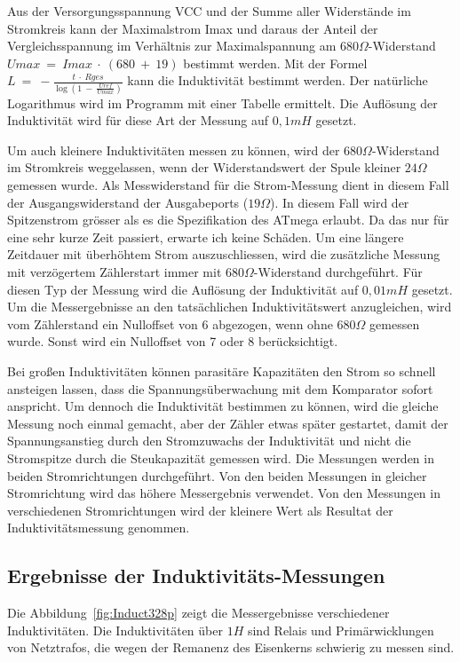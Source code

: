 Aus der Versorgungsspannung VCC und der Summe aller Widerstände im Stromkreis kann der Maximalstrom Imax und
daraus der Anteil der Vergleichsspannung im Verhältnis zur Maximalspannung am \(680\Omega\)-Widerstand
\(Umax~=~Imax~\cdot~(680~+~19)\) bestimmt werden.
Mit der Formel \(L~=~-\frac{t~\cdot~Rges}{\log{(1~-~\frac{Uref}{Umax})}}\) kann die Induktivität bestimmt werden.
Der natürliche Logarithmus wird im Programm mit einer Tabelle ermittelt.
Die Auflösung der Induktivität wird für diese Art der Messung auf \(0,1mH\) gesetzt.

Um auch kleinere Induktivitäten messen zu können, wird der \(680\Omega\)-Widerstand im Stromkreis weggelassen,
wenn der Widerstandswert der Spule kleiner \(24\Omega\) gemessen wurde. Als Messwiderstand für die Strom-Messung
dient in diesem Fall der Ausgangswiderstand der Ausgabeports (\(19\Omega\)). In diesem Fall wird der Spitzenstrom grösser
als es die Spezifikation des ATmega erlaubt. Da das nur für eine sehr kurze Zeit passiert, erwarte ich keine Schäden.
Um eine längere Zeitdauer mit überhöhtem Strom auszuschliessen, wird die zusätzliche Messung mit 
verzögertem Zählerstart immer mit \(680\Omega\)-Widerstand durchgeführt.
Für diesen Typ der Messung wird die Auflösung der Induktivität auf \(0,01mH\) gesetzt.
Um die Messergebnisse an den tatsächlichen Induktivitätswert anzugleichen, wird vom Zählerstand ein
Nulloffset von 6 abgezogen, wenn ohne \(680\Omega\) gemessen wurde. Sonst wird ein Nulloffset von 7 oder 8 berücksichtigt.


Bei großen Induktivitäten können parasitäre Kapazitäten den Strom so schnell ansteigen lassen, dass
die Spannungsüberwachung mit dem Komparator sofort anspricht. Um dennoch die Induktivität bestimmen zu
können, wird die gleiche Messung noch einmal gemacht, aber der Zähler etwas später gestartet, damit
der Spannungsanstieg durch den Stromzuwachs der Induktivität und nicht die Stromspitze durch die
Steukapazität gemessen wird.
Die Messungen werden in beiden Stromrichtungen durchgeführt.
Von den beiden Messungen in gleicher Stromrichtung wird das höhere Messergebnis verwendet.
Von den Messungen in verschiedenen Stromrichtungen wird der kleinere Wert als Resultat der Induktivitätsmessung genommen.

\subsection{Ergebnisse der Induktivitäts-Messungen}
Die Abbildung~\ref{fig:Induct328p} zeigt die Messergebnisse verschiedener Induktivitäten.
Die Induktivitäten über \(1 H\) sind Relais und Primärwicklungen von Netztrafos, die wegen
der Remanenz des Eisenkerns schwierig zu messen sind.

